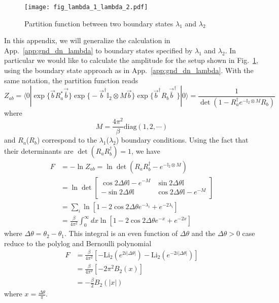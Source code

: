 
\begin{figure}[h]
\centering
\texttt{[image: fig\_lambda\_1\_lambda\_2.pdf]}
\caption{Partition function between two boundary states $\lambda_1$ and $\lambda_2$}
\label{Fig in lambda_1_lambda_2}
\end{figure}

In this appendix, we will generalize the calculation in App.~\ref{app:gnd_dn_lambda} to boundary states specified by $\lambda_1$ and $\lambda_2$. In particular we would like to calculate the amplitude for the setup shown in Fig.~\ref{Fig in lambda_1_lambda_2}, using the boundary state approach as in App.~\ref{app:gnd_dn_lambda}. With the same notation, the partition function reads
\begin{equation}
Z_{ab} = \langle 0 | \exp\Big\{ \vec{b} R_a^* \vec{\bar{b}}\Big\} \exp\Big\{ - \vec{b}^{\dagger} \mathbb{I}_2 \otimes M  \vec{b} \Big\}   \exp\Big\{  \vec{b}^{\dagger} R_b  \vec{\bar{b}}^{\dagger}\Big\}  |0  \rangle  = \frac{1}{\det ( 1 - R^{\dagger} _a  e^{- \mathbb{I}_2 \otimes M} R_b) }
\end{equation}
where
\begin{equation}
M =  \frac{4\pi^2}{\beta} \text{diag}( 1, 2, \cdots )
\end{equation}
and $R_a$($R_b$) correspond to the $\lambda_1$($\lambda_2$) boundary conditions. Using the fact that their determinants are $\det( R_a R_b^{\dagger})  = 1$, we have
\begin{equation}
\begin{aligned}
F &= - \ln Z_{ab} = \ln \det ( R_a R_b^{\dagger} - e^{- \mathbb{I}_2 \otimes M} )\\
& = \ln \det 
\begin{bmatrix}
\cos 2 \Delta \theta \mathbb{I} - e^{-M}   & \sin 2 \Delta \theta \mathbb{I}\\
- \sin 2\Delta \theta \mathbb{I}  &   \cos 2 \Delta \theta \mathbb{I} - e^{-M} \\ 
\end{bmatrix} \\
& = \sum_i \ln [ 1 - 2 \cos 2 \Delta \theta e^{- \lambda_i } + e^{- 2 \lambda_i }  ] \\
& = \frac{\beta}{4\pi^2} \int_0^{\infty} dx \ln [ 1 - 2 \cos 2 \Delta \theta e^{-x} + e^{-2x} ] 
\end{aligned}
\end{equation}
where $\Delta \theta = \theta_2 - \theta_1$. This integral is an even function of $\Delta \theta$ and the $\Delta \theta > 0$ case reduce to the polylog and Bernoulli polynomial
\begin{equation}
\begin{aligned}
  F &= \frac{\beta}{4\pi^2} \left[ - \text{Li}_2 ( e^{2i |\Delta \theta|} ) - \text{Li}_2 ( e^{- 2i |\Delta \theta|} ) \right] \\
  & = \frac{\beta}{4\pi^2}  \left[ - 2\pi^2 B_2 (x) \right] \\
  &= - \frac{\beta}{2} B_2( |x| ) 
\end{aligned}
\end{equation}
where $x = \frac{\Delta \theta}{ \pi}$. 

